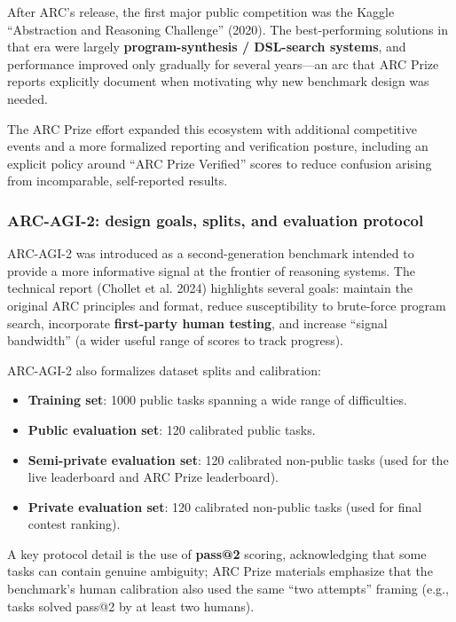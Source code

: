 \documentclass[11pt]{article}
\providecommand{\tightlist}{%
  \setlength{\itemsep}{0pt}\setlength{\parskip}{0pt}}
\begin{document}
After ARC's release, the first major public competition was the Kaggle
``Abstraction and Reasoning Challenge'' (2020). The best-performing
solutions in that era were largely \textbf{program-synthesis /
DSL-search systems}, and performance improved only gradually for several
years---an arc that ARC Prize reports explicitly document when
motivating why new benchmark design was needed.

The ARC Prize effort expanded this ecosystem with additional competitive
events and a more formalized reporting and verification posture,
including an explicit policy around ``ARC Prize Verified'' scores to
reduce confusion arising from incomparable, self-reported results.

\hypertarget{arc-agi-2-design-goals-splits-and-evaluation-protocol}{%
\subsubsection{ARC-AGI-2: design goals, splits, and evaluation
protocol}\label{arc-agi-2-design-goals-splits-and-evaluation-protocol}}

ARC-AGI-2 was introduced as a second-generation benchmark intended to
provide a more informative signal at the frontier of reasoning systems.
The technical report (Chollet et al. 2024) highlights several goals:
maintain the original ARC principles and format, reduce susceptibility
to brute-force program search, incorporate \textbf{first-party human
testing}, and increase ``signal bandwidth'' (a wider useful range of
scores to track progress).

ARC-AGI-2 also formalizes dataset splits and calibration:

\begin{itemize}
\tightlist
\item
  \textbf{Training set}: 1000 public tasks spanning a wide range of
  difficulties.
\item
  \textbf{Public evaluation set}: 120 calibrated public tasks.
\item
  \textbf{Semi-private evaluation set}: 120 calibrated non-public tasks
  (used for the live leaderboard and ARC Prize leaderboard).
\item
  \textbf{Private evaluation set}: 120 calibrated non-public tasks (used
  for final contest ranking).
\end{itemize}

A key protocol detail is the use of \textbf{pass@2} scoring,
acknowledging that some tasks can contain genuine ambiguity; ARC Prize
materials emphasize that the benchmark's human calibration also used the
same ``two attempts'' framing (e.g., tasks solved pass@2 by at least two
humans).
\end{document}

